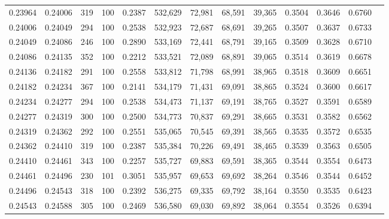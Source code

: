 \begin{tabular}{rrrrrrrrrrrrr}
0.23964 & 0.24006 &   319 & 100 &                                     0.2387 & 532,629 &  72,981 &  68,591 &  39,365 & 0.3504 & 0.3646 & 0.6760 \\
0.24006 & 0.24049 &   294 & 100 &                                     0.2538 & 532,923 &  72,687 &  68,691 &  39,265 & 0.3507 & 0.3637 & 0.6733 \\
0.24049 & 0.24086 &   246 & 100 &                                     0.2890 & 533,169 &  72,441 &  68,791 &  39,165 & 0.3509 & 0.3628 & 0.6710 \\
0.24086 & 0.24135 &   352 & 100 &                                     0.2212 & 533,521 &  72,089 &  68,891 &  39,065 & 0.3514 & 0.3619 & 0.6678 \\
0.24136 & 0.24182 &   291 & 100 &                                     0.2558 & 533,812 &  71,798 &  68,991 &  38,965 & 0.3518 & 0.3609 & 0.6651 \\
0.24182 & 0.24234 &   367 & 100 &                                     0.2141 & 534,179 &  71,431 &  69,091 &  38,865 & 0.3524 & 0.3600 & 0.6617 \\
0.24234 & 0.24277 &   294 & 100 &                                     0.2538 & 534,473 &  71,137 &  69,191 &  38,765 & 0.3527 & 0.3591 & 0.6589 \\
0.24277 & 0.24319 &   300 & 100 &                                     0.2500 & 534,773 &  70,837 &  69,291 &  38,665 & 0.3531 & 0.3582 & 0.6562 \\
0.24319 & 0.24362 &   292 & 100 &                                     0.2551 & 535,065 &  70,545 &  69,391 &  38,565 & 0.3535 & 0.3572 & 0.6535 \\
0.24362 & 0.24410 &   319 & 100 &                                     0.2387 & 535,384 &  70,226 &  69,491 &  38,465 & 0.3539 & 0.3563 & 0.6505 \\
0.24410 & 0.24461 &   343 & 100 &                                     0.2257 & 535,727 &  69,883 &  69,591 &  38,365 & 0.3544 & 0.3554 & 0.6473 \\
0.24461 & 0.24496 &   230 & 101 &                                     0.3051 & 535,957 &  69,653 &  69,692 &  38,264 & 0.3546 & 0.3544 & 0.6452 \\
0.24496 & 0.24543 &   318 & 100 &                                     0.2392 & 536,275 &  69,335 &  69,792 &  38,164 & 0.3550 & 0.3535 & 0.6423 \\
0.24543 & 0.24588 &   305 & 100 &                                     0.2469 & 536,580 &  69,030 &  69,892 &  38,064 & 0.3554 & 0.3526 & 0.6394 \\

\end{tabular}
